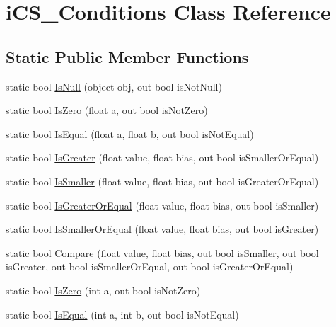 \hypertarget{classi_c_s___conditions}{\section{i\+C\+S\+\_\+\+Conditions Class Reference}
\label{classi_c_s___conditions}
}
\subsection*{Static Public Member Functions}
\begin{DoxyCompactItemize}
\item 
static bool \hyperlink{classi_c_s___conditions_a9d66ba204383d55a842d9dedddd6b503}{Is\+Null} (object obj, out bool is\+Not\+Null)
\item 
static bool \hyperlink{classi_c_s___conditions_a3983fe340f51aca91bd49e179fc518f7}{Is\+Zero} (float a, out bool is\+Not\+Zero)
\item 
static bool \hyperlink{classi_c_s___conditions_a010630cadc5538c3bd8d4b2a860be2a7}{Is\+Equal} (float a, float b, out bool is\+Not\+Equal)
\item 
static bool \hyperlink{classi_c_s___conditions_a4a2fcec00bb5922c9baff1aa4a624eba}{Is\+Greater} (float value, float bias, out bool is\+Smaller\+Or\+Equal)
\item 
static bool \hyperlink{classi_c_s___conditions_acc18074d99cdf8ac074d2ea6fcba6c77}{Is\+Smaller} (float value, float bias, out bool is\+Greater\+Or\+Equal)
\item 
static bool \hyperlink{classi_c_s___conditions_a396982e64701dac35d4baa3670ac1d36}{Is\+Greater\+Or\+Equal} (float value, float bias, out bool is\+Smaller)
\item 
static bool \hyperlink{classi_c_s___conditions_a17544f01901cd9112c1e69ef945550c7}{Is\+Smaller\+Or\+Equal} (float value, float bias, out bool is\+Greater)
\item 
static bool \hyperlink{classi_c_s___conditions_a11f18c55d7a0bd66855cf19ee3f54390}{Compare} (float value, float bias, out bool is\+Smaller, out bool is\+Greater, out bool is\+Smaller\+Or\+Equal, out bool is\+Greater\+Or\+Equal)
\item 
static bool \hyperlink{classi_c_s___conditions_a94980aa2f36f01e4c68df4d4ae6a77e1}{Is\+Zero} (int a, out bool is\+Not\+Zero)
\item 
static bool \hyperlink{classi_c_s___conditions_aa687442a4c0f0511a75ec2115026f925}{Is\+Equal} (int a, int b, out bool is\+Not\+Equal)
\item 

\end{DoxyCompactItemize}
